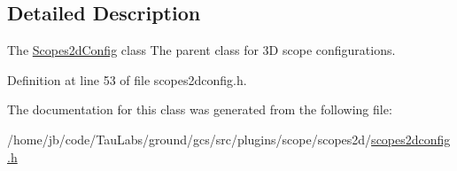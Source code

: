 \subsection{\-Detailed \-Description}
\-The \hyperlink{class_scopes2d_config}{\-Scopes2d\-Config} class \-The parent class for 3\-D scope configurations. 

\-Definition at line 53 of file scopes2dconfig.\-h.



\-The documentation for this class was generated from the following file\-:\begin{DoxyCompactItemize}
\item 
/home/jb/code/\-Tau\-Labs/ground/gcs/src/plugins/scope/scopes2d/\hyperlink{scopes2dconfig_8h}{scopes2dconfig.\-h}\end{DoxyCompactItemize}
